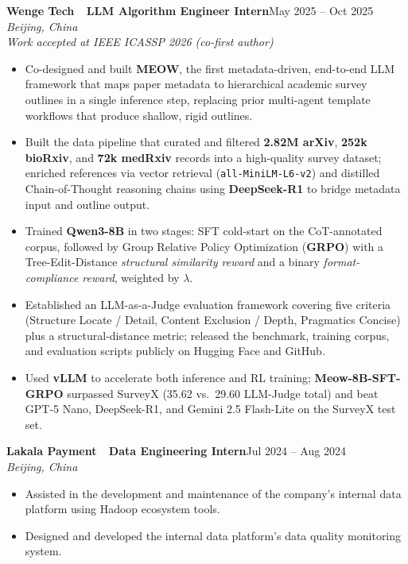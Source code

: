 \documentclass[11pt,letterpaper]{article}
\newcommand{\entry}[4]{%
  \noindent\textbf{\color{ink}#1}\hfill{\color{soft}\small #3}\\[1pt]%
  \textit{\color{muted}#2}\hfill\textit{\color{soft}\small #4}%
  \vspace{2pt}%
}
\begin{document}
\vspace{4pt}
\entry{Wenge Tech \,\textemdash\, LLM Algorithm Engineer Intern}{Beijing, China}{May 2025 -- Oct 2025}{}\\[1pt]
{\small\color{accent}\itshape Work accepted at IEEE ICASSP 2026 (co-first author)}
\begin{itemize}
  \item Co-designed and built \textbf{MEOW}, the first metadata-driven, end-to-end LLM framework that maps paper metadata to hierarchical academic survey outlines in a single inference step, replacing prior multi-agent template workflows that produce shallow, rigid outlines.
  \item Built the data pipeline that curated and filtered \textbf{2.82M arXiv}, \textbf{252k bioRxiv}, and \textbf{72k medRxiv} records into a high-quality survey dataset; enriched references via vector retrieval (\texttt{all-MiniLM-L6-v2}) and distilled Chain-of-Thought reasoning chains using \textbf{DeepSeek-R1} to bridge metadata input and outline output.
  \item Trained \textbf{Qwen3-8B} in two stages: SFT cold-start on the CoT-annotated corpus, followed by Group Relative Policy Optimization (\textbf{GRPO}) with a Tree-Edit-Distance \textit{structural similarity reward} and a binary \textit{format-compliance reward}, weighted by $\lambda$.
  \item Established an LLM-as-a-Judge evaluation framework covering five criteria (Structure Locate / Detail, Content Exclusion / Depth, Pragmatics Concise) plus a structural-distance metric; released the benchmark, training corpus, and evaluation scripts publicly on Hugging Face and GitHub.
  \item Used \textbf{vLLM} to accelerate both inference and RL training; \textbf{Meow-8B-SFT-GRPO} surpassed SurveyX (35.62 vs.\ 29.60 LLM-Judge total) and beat GPT-5 Nano, DeepSeek-R1, and Gemini 2.5 Flash-Lite on the SurveyX test set.
\end{itemize}

\vspace{4pt}
\entry{Lakala Payment \,\textemdash\, Data Engineering Intern}{Beijing, China}{Jul 2024 -- Aug 2024}{}
\begin{itemize}
  \item Assisted in the development and maintenance of the company's internal data platform using Hadoop ecosystem tools.
  \item Designed and developed the internal data platform's data quality monitoring system.
\end{itemize}
\end{document}
